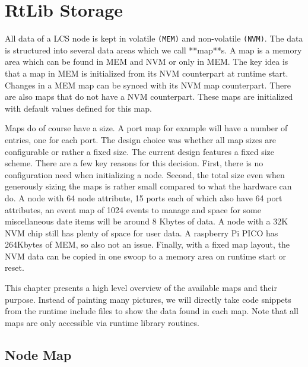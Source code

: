 \chapter{RtLib Storage}

All data of a LCS node is kept in volatile \texttt{(MEM)} and non-volatile \texttt{(NVM)}. The data is structured into several data areas which we call **map**s. A map is a memory area which can be found in MEM and NVM or only in MEM. The key idea is that a map in MEM is initialized from its NVM counterpart at runtime start. Changes in a MEM map can be synced with its NVM map counterpart. There are also maps that do not have a NVM counterpart. These maps are initialized with default values defined for this map. 

Maps do of course have a size. A port map for example will have a number of entries, one for each port. The design choice was whether all map sizes are configurable or rather a fixed size. The current design features a fixed size scheme. There are a few key reasons for this decision. First, there is no configuration need when initializing a node. Second, the total size even when generously sizing the maps is rather small compared to what the hardware can do. A node with 64 node attribute, 15 ports each of which also have 64 port attributes, an event map of 1024 events to manage and space for some miscellaneous date items will be around 8 Kbytes of data. A node with a 32K NVM chip still has plenty of space for user data. A raspberry Pi PICO has 264Kbytes of MEM, so also not an issue. Finally, with a fixed map layout, the NVM data can be copied in one swoop to a memory area on runtime start or reset. 

This chapter presents a high level overview of the available maps and their purpose. Instead of painting many pictures, we will directly take code snippets from the runtime include files to show the data found in each map. Note that all maps are only accessible via runtime library routines.

\section{Node Map}

